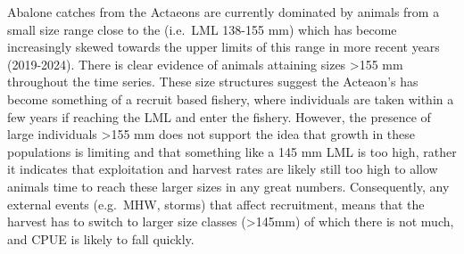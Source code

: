 \documentclass[
]{article}
\begin{document}
Abalone catches from the Actaeons are currently dominated by animals from a small size range close to the (i.e.~LML 138-155 mm) which has become increasingly skewed towards the upper limits of this range in more recent years (2019-2024). There is clear evidence of animals attaining sizes \textgreater155 mm throughout the time series. These size structures suggest the Acteaon's has become something of a recruit based fishery, where individuals are taken within a few years if reaching the LML and enter the fishery. However, the presence of large individuals \textgreater155 mm does not support the idea that growth in these populations is limiting and that something like a 145 mm LML is too high, rather it indicates that exploitation and harvest rates are likely still too high to allow animals time to reach these larger sizes in any great numbers. Consequently, any external events (e.g.~MHW, storms) that affect recruitment, means that the harvest has to switch to larger size classes (\textgreater145mm) of which there is not much, and CPUE is likely to fall quickly.
\end{document}
